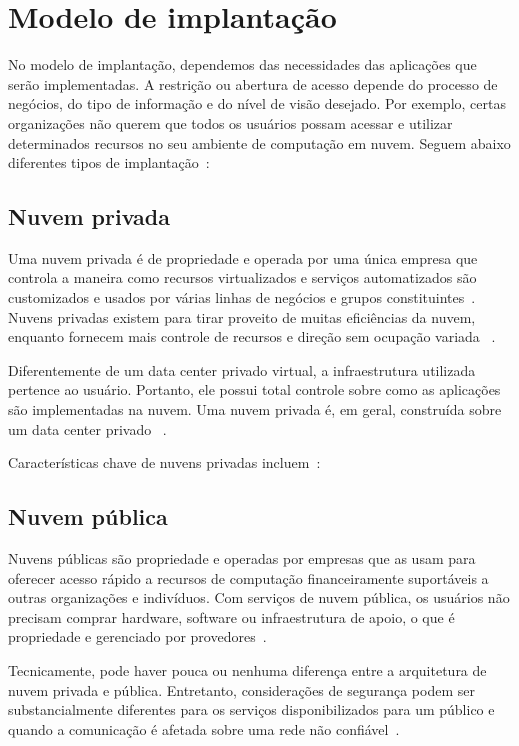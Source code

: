\section{Modelo de implantação}

No modelo de implantação, dependemos das necessidades das aplicações que serão
implementadas. A restrição ou abertura de acesso depende do processo de negócios,
do tipo de informação e do nível de visão desejado. Por exemplo, certas
organizações não querem que todos os usuários possam acessar e utilizar
determinados recursos no seu ambiente de computação em nuvem. Seguem abaixo
diferentes tipos de implantação~\cite{ibm-what-is-cloud-computing}:

\subsection{Nuvem privada}

Uma nuvem privada é de propriedade e operada por uma única empresa que controla a 
maneira como recursos virtualizados e serviços automatizados são customizados e 
usados por várias linhas de negócios e grupos 
constituintes~\cite{ibm-what-is-cloud-computing}. Nuvens privadas existem para tirar 
proveito de muitas eficiências da nuvem, enquanto fornecem mais controle de recursos 
e direção sem ocupação variada ~\cite{ibm-what-is-cloud-computing}.

Diferentemente de um data center privado virtual, a infraestrutura utilizada
pertence ao usuário. Portanto, ele possui total controle sobre como as aplicações
são implementadas na nuvem. Uma nuvem privada é, em geral, construída sobre um data
center privado ~\cite{technet-cloud-computing}.

Características chave de nuvens privadas incluem~\cite{ibm-what-is-cloud-computing}:

\subsection{Nuvem pública}

Nuvens públicas são propriedade e operadas por empresas que as usam para
oferecer acesso rápido a recursos de computação financeiramente suportáveis a outras
organizações e indivíduos. Com serviços de nuvem pública, os usuários não precisam
comprar hardware, software ou infraestrutura de apoio, o que é propriedade e
gerenciado por provedores~\cite{ibm-what-is-cloud-computing}.

Tecnicamente, pode haver pouca ou nenhuma diferença entre a arquitetura de nuvem
privada e pública. Entretanto, considerações de segurança podem ser substancialmente
diferentes para os serviços disponibilizados para um público e quando a comunicação
é afetada sobre uma rede não confiável~\cite{sequeira2015comptia}.

